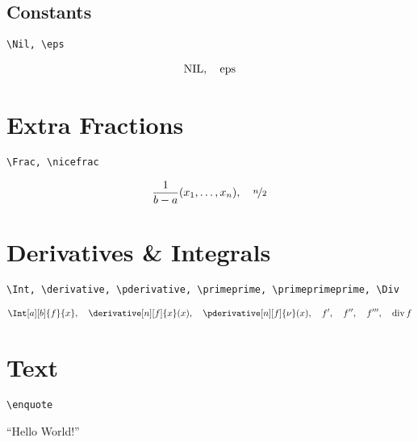 \documentclass{article}
\begin{document}
\subsection{Constants}

\verb|\Nil, \eps|

\begin{align*}
    \NIL,
    \quad
    \eps
\end{align*}


\section{Extra Fractions}

\verb|\Frac, \nicefrac|

\begin{align*}
    \Frac{x_1, \dots, x_n}{b - a},
    \quad
    \nicefrac{n}{2}
\end{align*}


\section{Derivatives \& Integrals}

\verb|\Int, \derivative, \pderivative, \primeprime, \primeprimeprime, \Div|

\begin{align*}
    \Int[a][b]{f}{x},
    \quad
    \derivative[n][f]{x}(x),
    \quad
    \pderivative[n][f]{\nu}(x),
    \quad
    f^\prime,
    \quad
    f^\primeprime,
    \quad
    f^\primeprimeprime,
    \quad
    \Div f
\end{align*}


\section{Text}

\verb|\enquote|

\begin{center}
    \enquote{Hello World!}
\end{center}


\printbibliography
\end{document}
